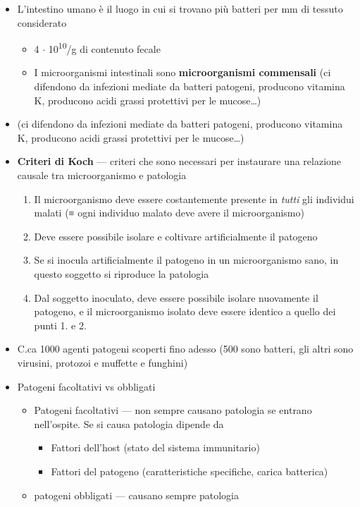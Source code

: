 \documentclass[italian,]{article}
\providecommand{\tightlist}{%
  \setlength{\itemsep}{0pt}\setlength{\parskip}{0pt}}
\begin{document}
\begin{itemize}
\tightlist
\item
  L'intestino umano è il luogo in cui si trovano più batteri per mm di
  tessuto considerato

  \begin{itemize}
  \tightlist
  \item
    4 \(\cdot\) 10\textsuperscript{10}/g di contenuto fecale
  \item
    I microorganismi intestinali sono \textbf{microorganismi commensali}
    (ci difendono da infezioni mediate da batteri patogeni, producono
    vitamina K, producono acidi grassi protettivi per le mucose\ldots{})
  \end{itemize}
\item
  (ci difendono da infezioni mediate da batteri patogeni, producono
  vitamina K, producono acidi grassi protettivi per le mucose\ldots{})
\item
  \textbf{Criteri di Koch} --- criteri che sono necessari per instaurare
  una relazione causale tra microorganismo e patologia

  \begin{enumerate}
  \def\labelenumi{\arabic{enumi}.}
  \tightlist
  \item
    Il microorganismo deve essere costantemente presente in \emph{tutti}
    gli individui malati (≡ ogni individuo malato deve avere il
    microorganismo)
  \item
    Deve essere possibile isolare e coltivare artificialmente il
    patogeno
  \item
    Se si inocula artificialmente il patogeno in un microorganismo sano,
    in questo soggetto si riproduce la patologia
  \item
    Dal soggetto inoculato, deve essere possibile isolare nuovamente il
    patogeno, e il microorganismo isolato deve essere identico a quello
    dei punti 1. e 2.
  \end{enumerate}
\item
  C.ca 1000 agenti patogeni scoperti fino adesso (500 sono batteri, gli
  altri sono virusini, protozoi e muffette e funghini)
\item
  Patogeni facoltativi vs obbligati

  \begin{itemize}
  \tightlist
  \item
    Patogeni facoltativi --- non sempre causano patologia se entrano
    nell'ospite. Se si causa patologia dipende da

    \begin{itemize}
    \tightlist
    \item
      Fattori dell'host (stato del sistema immunitario)
    \item
      Fattori del patogeno (caratteristiche specifiche, carica
      batterica)
    \end{itemize}
  \item
    patogeni obbligati --- causano sempre patologia
  \end{itemize}
\end{itemize}
\end{document}
